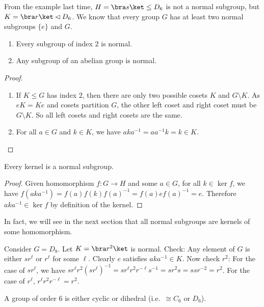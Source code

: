 \documentclass[a4paper]{article}
\begin{document}
From the example last time, $H=\bra s\ket\leq D_6$ is not a normal subgroup, but $K=\bra r\ket \lhd D_6$. We know that every group $G$ has at least two normal subgroups $\{e\}$ and $G$.

\begin{lemma}\leavevmode
  \begin{enumerate}
    \item Every subgroup of index $2$ is normal.
    \item Any subgroup of an abelian group is normal.
  \end{enumerate}
\end{lemma}

\begin{proof}\leavevmode
  \begin{enumerate}
    \item If $K\leq G$ has index $2$, then there are only two possible cosets $K$ and $G\setminus K$. As $eK = Ke$ and cosets partition $G$, the other left coset and right coset must be $G\setminus K$. So all left cosets and right cosets are the same.
    \item For all $a\in G$ and $k\in K$, we have $aka^{-1} = aa^{-1}k = k\in K$.
  \end{enumerate}
\end{proof}
\begin{prop}
  Every kernel is a normal subgroup.
\end{prop}

\begin{proof}
  Given homomorphism $f:G\rightarrow H$ and some $a\in G$, for all $k\in \ker f$, we have $f(aka^{-1}) = f(a)f(k)f(a)^{-1} = f(a)ef(a)^{-1} = e$. Therefore $aka^{-1}\in\ker f$ by definition of the kernel.
\end{proof}

In fact, we will see in the next section that all normal subgroups are kernels of some homomorphism.

\begin{eg}
  Consider $G = D_8$. Let $K = \bra r^2\ket$ is normal. Check: Any element of $G$ is either $sr^\ell$ or $r^\ell$ for some $\ell$. Clearly $e$ satisfies $aka^{-1}\in K$. Now check $r^2$: For the case of $sr^\ell$, we have $sr^\ell r^2(sr^\ell)^{-1} = sr^\ell r^2 r^{-\ell}s^{-1} = sr^2 s = ssr^{-2} = r^2$. For the case of $r^\ell$, $r^\ell r^2r^{-\ell} = r^2$.
\end{eg}

\begin{prop}
  A group of order $6$ is either cyclic or dihedral (i.e.\ $\cong C_6$ or $D_6$).
\end{prop}
\end{document}
